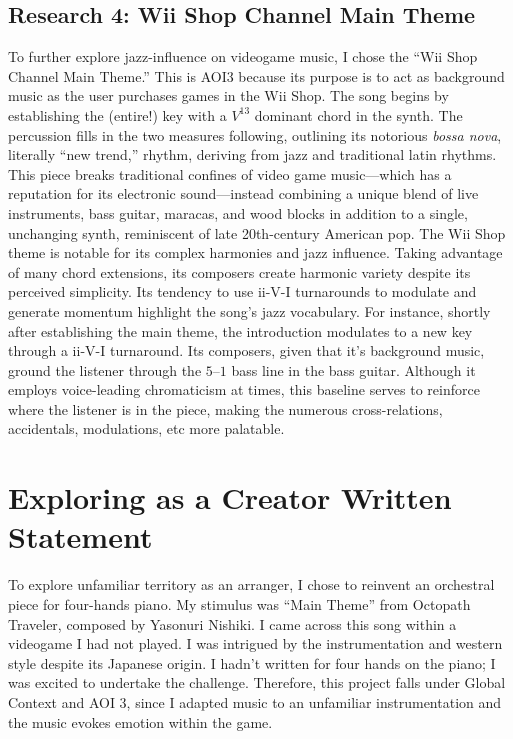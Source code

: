 \documentclass[12pt]{article}
\begin{document}
\subsection{Research 4: Wii Shop Channel Main Theme}

To further explore jazz-influence on videogame music, I chose the “Wii Shop Channel Main Theme.” This is AOI3 because its purpose is to act as background music as the user purchases games in the Wii Shop.
    The song begins by establishing the (entire!) key with a $V^{13}$ dominant chord in the synth. The percussion fills in the two measures following, outlining its notorious \textit{bossa nova}, literally “new trend,” rhythm, deriving from jazz and traditional latin rhythms. This piece breaks traditional confines of video game music---which has a reputation for its electronic sound---instead combining a unique blend of live instruments, bass guitar, maracas, and wood blocks in addition to a single, unchanging synth, reminiscent of late 20th-century American pop.
    The Wii Shop theme is notable for its complex harmonies and jazz influence. Taking advantage of many chord extensions, its composers create harmonic variety despite its perceived simplicity. Its tendency to use ii-V-I turnarounds to modulate and generate momentum highlight the song's jazz vocabulary. For instance, shortly after establishing the main theme, the introduction modulates to a new key through a ii-V-I turnaround. Its composers, given that it's background music, ground the listener through the $5–1$ bass line in the bass guitar. Although it employs voice-leading chromaticism at times, this baseline serves to reinforce where the listener is in the piece, making the numerous cross-relations, accidentals, modulations, etc more palatable.\autocite{wiishop}
    
\section{Exploring as a Creator Written Statement}

To explore unfamiliar territory as an arranger, I chose to reinvent an orchestral piece for four-hands piano. My stimulus was “Main Theme” from Octopath Traveler, composed by Yasonuri Nishiki. I came across this song within a videogame I had not played. I was intrigued by the instrumentation and western style despite its Japanese origin. I hadn’t written for four hands on the piano; I was excited to undertake the challenge. Therefore, this project falls under Global Context and AOI 3, since I adapted music to an unfamiliar instrumentation and the music evokes emotion within the game. 
\end{document}
